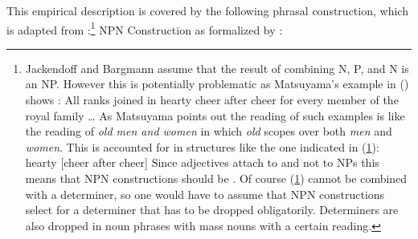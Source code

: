 \documentclass[output=paper]{langsci/langscibook}
\begin{document}
This empirical description is covered by the following phrasal construction, which is adapted from
:\footnote{%
Jackendoff and Bargmann assume that the result of combining N, P, and N is an NP. However this is
potentially problematic as Matsuyama's example in () shows \citep[]{Matsuyama2004a}:
\ea
All ranks joined in hearty cheer after cheer for every member of the royal family \ldots
\z
As Matsuyama points out the reading of such examples is like the reading of \emph{old men and women}
in which \emph{old} scopes over both \emph{men} and \emph{women}. This is accounted for in
structures like the one indicated in (\ref{ex-hearty-cheer-after-cheer}):
\ea
\label{ex-hearty-cheer-after-cheer}
hearty [cheer after cheer]
\z
Since adjectives attach to \nbars and not to NPs this means that NPN constructions should be
\nbars. Of course (\ref{ex-hearty-cheer-after-cheer}) cannot be combined with a determiner, so one would have to assume that
NPN constructions select for a determiner that has to be dropped obligatorily. Determiners are also
dropped in noun phrases with mass nouns with a certain reading.
}
\ea
\label{ex-npn-bragmann}%
NPN Construction as formalized by :\\
\end{document}
